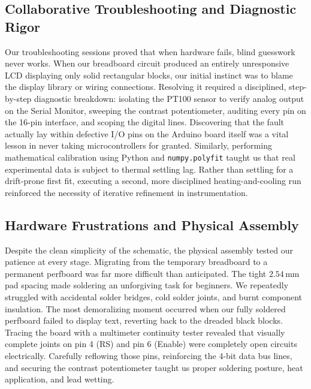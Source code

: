 \documentclass[journal,12pt,onecolumn]{IEEEtran}
\begin{document}
\subsection{Collaborative Troubleshooting and Diagnostic Rigor}
Our troubleshooting sessions proved that when hardware fails, blind guesswork never works. When our breadboard circuit produced an entirely unresponsive LCD displaying only solid rectangular blocks, our initial instinct was to blame the display library or wiring connections. Resolving it required a disciplined, step-by-step diagnostic breakdown: isolating the PT100 sensor to verify analog output on the Serial Monitor, sweeping the contrast potentiometer, auditing every pin on the 16-pin interface, and scoping the digital lines. Discovering that the fault actually lay within defective I/O pins on the Arduino board itself was a vital lesson in never taking microcontrollers for granted. Similarly, performing mathematical calibration using Python and \texttt{numpy.polyfit} taught us that real experimental data is subject to thermal settling lag. Rather than settling for a drift-prone first fit, executing a second, more disciplined heating-and-cooling run reinforced the necessity of iterative refinement in instrumentation.

\subsection{Hardware Frustrations and Physical Assembly}
Despite the clean simplicity of the schematic, the physical assembly tested our patience at every stage. Migrating from the temporary breadboard to a permanent perfboard was far more difficult than anticipated. The tight $2.54\,\text{mm}$ pad spacing made soldering an unforgiving task for beginners. We repeatedly struggled with accidental solder bridges, cold solder joints, and burnt component insulation. The most demoralizing moment occurred when our fully soldered perfboard failed to display text, reverting back to the dreaded black blocks. Tracing the board with a multimeter continuity tester revealed that visually complete joints on pin 4 (RS) and pin 6 (Enable) were completely open circuits electrically. Carefully reflowing those pins, reinforcing the 4-bit data bus lines, and securing the contrast potentiometer taught us proper soldering posture, heat application, and lead wetting.
\end{document}
